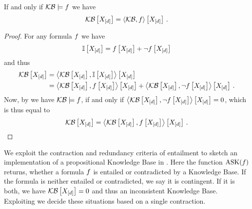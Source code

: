 \begin{theorem}
    \label{the:ReduncancyOfEntailed}
    If and only if $\mathcal{KB}\models f$ we have
    \begin{align*}
        \mathcal{KB}\left[X_{[d]}\right]= \left\langle \mathcal{KB},f\right\rangle \left[ X_{[d]} \right]  \, .
    \end{align*}
\end{theorem}
\begin{proof}
    For any formula $f$ we have
    \begin{align*}
        \mathbb{I}\left[X_{[d]}\right] = f\left[X_{[d]}\right] + \lnot f\left[X_{[d]}\right]
    \end{align*}
    and thus
    \begin{align*}
        \mathcal{KB}\left[X_{[d]}\right]
        & = \left\langle \mathcal{KB}\left[X_{[d]}\right],\mathbb{I}\left[X_{[d]}\right]\right\rangle \left[ X_{[d]} \right] \\
        & = \left\langle \mathcal{KB}\left[X_{[d]}\right],f\left[X_{[d]}\right]\right\rangle \left[ X_{[d]} \right] +  \left\langle \mathcal{KB}\left[X_{[d]}\right],\lnot f\left[X_{[d]}\right]\right\rangle \left[ X_{[d]} \right] \, .
    \end{align*}
    Now, by  we have $\mathcal{KB}\models f$, if and only if $\left\langle \mathcal{KB}\left[X_{[d]}\right],\lnot f\left[X_{[d]}\right]\right\rangle \left[ X_{[d]} \right]=0$, which is thus equal to
    \begin{align*}
        \mathcal{KB}\left[X_{[d]}\right]
        = \left\langle \mathcal{KB}\left[X_{[d]}\right],f\left[X_{[d]}\right]\right\rangle \left[ X_{[d]} \right] \, .
    \end{align*}
\end{proof}



We exploit the contraction and redundancy criteria of entailment to sketch an implementation of a propositional Knowledge Base in .
Here the function $\mathrm{ASK}(f)$ returns, whether a formula $f$ is entailed or contradicted by a Knowledge Base.
If the formula is neither entailed or contradicted, we say it is contingent.
If it is both, we have $\mathcal{KB}\left[X_{[d]}\right]=0$ and thus an inconsistent Knowledge Base.
Exploiting  we decide these situations based on a single contraction.


